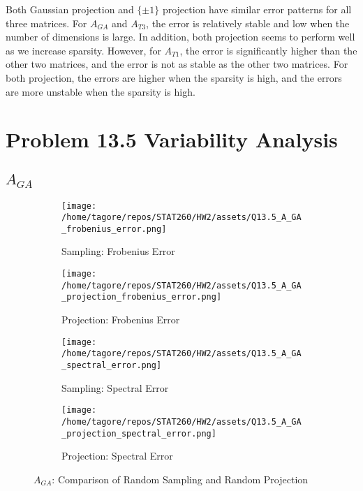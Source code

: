 \documentclass{article}
\begin{document}
Both Gaussian projection and $\{\pm 1\}$ projection have similar error patterns for all three matrices. For $A_{GA}$ and $A_{T3}$, the error is relatively stable and low when the number of dimensions is large. 
In addition, both projection seems to perform well as we increase sparsity. However, for $A_{T1}$, the error is significantly higher than the other two matrices, and the error is not as stable as the other two matrices.
For both projection, the errors are higher when the sparsity is high, and the errors are more unstable when the sparsity is high.


\section*{Problem 13.5 Variability Analysis}
\subsection*{\(A_{GA}\)}

\begin{figure}[H]
    \centering
    \begin{subfigure}[b]{0.48\textwidth}
        \centering
        \texttt{[image: /home/tagore/repos/STAT260/HW2/assets/Q13.5\_A\_GA\_frobenius\_error.png]}
        \caption{Sampling: Frobenius Error}
        \label{fig:GA_fs}
    \end{subfigure}
    \hfill
    \begin{subfigure}[b]{0.48\textwidth}
        \centering
        \texttt{[image: /home/tagore/repos/STAT260/HW2/assets/Q13.5\_A\_GA\_projection\_frobenius\_error.png]}
        \caption{Projection: Frobenius Error}
        \label{fig:GA_fp}
    \end{subfigure}
    
    \vspace{0.5cm}
    
    \begin{subfigure}[b]{0.48\textwidth}
        \centering
        \texttt{[image: /home/tagore/repos/STAT260/HW2/assets/Q13.5\_A\_GA\_spectral\_error.png]}
        \caption{Sampling: Spectral Error}
        \label{fig:GA_ss}
    \end{subfigure}
    \hfill
    \begin{subfigure}[b]{0.48\textwidth}
        \centering
        \texttt{[image: /home/tagore/repos/STAT260/HW2/assets/Q13.5\_A\_GA\_projection\_spectral\_error.png]}
        \caption{Projection: Spectral Error}
        \label{fig:GA_sp}
    \end{subfigure}
    
    \caption{\(A_{GA}\): Comparison of Random Sampling and Random Projection}
    \label{fig:GA_comparison}
\end{figure}
\end{document}
